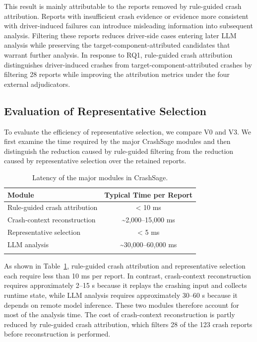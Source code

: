 \documentclass[pdflatex,sn-basic]{sn-jnl}%
\renewcommand{\arraystretch}{1.16}%
\newcommand{\compacttable}{\scriptsize\setlength{\tabcolsep}{2.2pt}\renewcommand{\arraystretch}{1.12}}%
\theoremstyle{thmstyleone}%
\theoremstyle{thmstyletwo}%
\theoremstyle{thmstylethree}%
\begin{document}
This result is mainly attributable to the reports removed by rule-guided crash attribution. Reports with insufficient crash evidence or evidence more consistent with driver-induced failures can introduce misleading information into subsequent analysis. Filtering these reports reduces driver-side cases entering later LLM analysis while preserving the target-component-attributed candidates that warrant further analysis. In response to RQ1, rule-guided crash attribution distinguishes driver-induced crashes from target-component-attributed crashes by filtering 28 reports while improving the attribution metrics under the four external adjudicators.

\FloatBarrier
\subsection{Evaluation of Representative Selection}

To evaluate the efficiency of representative selection, we compare V0 and V3. We first examine the time required by the major CrashSage modules and then distinguish the reduction caused by rule-guided filtering from the reduction caused by representative selection over the retained reports.

\begin{table}[ht]
\caption{Latency of the major modules in CrashSage.}
\label{tab:stage-latency}
\centering
\compacttable
\setlength{\tabcolsep}{4pt}
\begin{tabular*}{\linewidth}{@{\extracolsep{\fill}}lc}
\toprule
\textbf{Module} & \textbf{Typical Time per Report} \\
\midrule
Rule-guided crash attribution & \textless{} 10 ms \\
Crash-context reconstruction & \textasciitilde{}2,000--15,000 ms \\
Representative selection & \textless{} 5 ms \\
LLM analysis & \textasciitilde{}30,000--60,000 ms \\
\botrule
\end{tabular*}
\end{table}

As shown in Table~\ref{tab:stage-latency}, rule-guided crash attribution and representative selection each require less than 10 ms per report. In contrast, crash-context reconstruction requires approximately 2--15 s because it replays the crashing input and collects runtime state, while LLM analysis requires approximately 30--60 s because it depends on remote model inference. These two modules therefore account for most of the analysis time. The cost of crash-context reconstruction is partly reduced by rule-guided crash attribution, which filters 28 of the 123 crash reports before reconstruction is performed.
\end{document}
